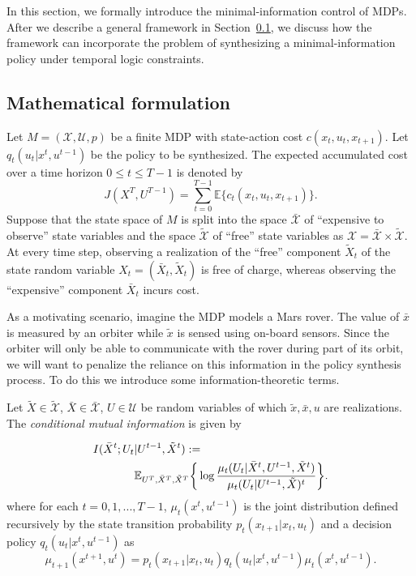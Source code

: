 In this section, we formally introduce the minimal-information control of MDPs.
After we describe a general framework in Section~\ref{secformulation}, we discuss how the framework can incorporate the problem of synthesizing a minimal-information policy under temporal logic constraints.

\subsection{Mathematical formulation}
\label{secformulation}

Let $M=(\mathcal{X}, \mathcal{U}, p)$ be a finite MDP with state-action cost $c(x_t, u_t, x_{t+1})$. Let $q_t(u_t|x^t,u^{t-1})$ be the policy to be synthesized. The expected accumulated cost over a time horizon $0\leq t \leq T-1$ is denoted by
\[
J(X^T, U^{T-1})=\sum_{t=0}^{T-1}\mathbb{E}\{c_t(x_t, u_t, x_{t+1})\}.
\]
Suppose that the state space of $M$ is split into the space $\bar{\mathcal{X}}$ of ``expensive to observe'' state variables and the space $\tilde{\mathcal{X}}$ of ``free'' state variables as $\mathcal{X}=\bar{\mathcal{X}}\times \tilde{\mathcal{X}}$.
At every time step, observing a realization of the ``free'' component $\tilde{X}_t$ of the state random variable $X_t=(\bar{X}_t, \tilde{X}_t)$ is free of charge, whereas observing the ``expensive'' component $\bar{X}_t$ incurs cost. 

As a motivating scenario, imagine the MDP models a Mars rover. The value of $\bar{x}$ is measured by an orbiter while $\tilde{x}$ is sensed using on-board sensors. Since the orbiter will only be able to communicate with the rover during part of its orbit, we will want to penalize the reliance on this information in the policy synthesis process. To do this we introduce some information-theoretic terms. 

Let $\tilde{X} \in \mathcal{\tilde{X}}$, $\bar{X} \in \mathcal{\bar{X}}$, $U\in \mathcal{U}$ be random variables of which $\tilde{x},\bar{x},u$ are realizations. The \emph{conditional mutual information} is given by 

\begin{align*}
I  (\bar{X}^t;U_t & \vert U^{t-1},\tilde{X}^{t}) := \nonumber \\ &\mathbb{E}_{U^T,\bar{X}^T,\tilde{X}^T}\bigg\{\log\frac{\mu_{t}(U_t|\bar{X}^{t},U^{t-1},\tilde{X}^t)}{\mu_{t}(U_t\vert U^{t-1}, \tilde{X})^t}\bigg\}.
\end{align*}
where for each $t=0,1, ..., T-1$, $\mu_t(x^t, u^{t-1})$ is the joint distribution defined recursively by the state transition probability $p_t(x_{t+1}|x_t, u_t)$ and a decision policy $q_t(u_t|x^t, u^{t-1})$ as
\[
\mu_{t+1}(x^{t+1}, u^t)=p_t(x_{t+1}|x_t, u_t)q_t(u_t|x^t, u^{t-1})\mu_t(x^t, u^{t-1}).
\]


